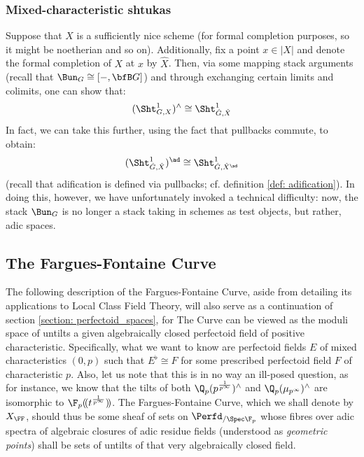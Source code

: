             \subsubsection{Mixed-characteristic shtukas}
                Suppose that $X$ is a sufficiently nice scheme (for formal completion purposes, so it might be noetherian and so on). Additionally, fix a point $x \in |X|$ and denote the formal completion of $X$ at $x$ by $\hat{X}$. Then, via some mapping stack arguments (recall that $\Bun_G \cong [-, \bfB G]$) and through exchanging certain limits and colimits, one can show that:
                    $$(\Sht^1_{G, X})^{\wedge} \cong \Sht^1_{\hat{G}, \hat{X}}$$
                In fact, we can take this further, using the fact that pullbacks commute, to obtain:
                    $$(\Sht^1_{\hat{G}, \hat{X}})^{\ad} \cong \Sht^1_{\hat{G}, \hat{X}^{\ad}}$$
                (recall that adification is defined via pullbacks; cf. definition \ref{def: adification}). In doing this, however, we have unfortunately invoked a technical difficulty: now, the stack $\Bun_G$ is no longer a stack taking in schemes as test objects, but rather, adic spaces. 
        
        \subsection{The Fargues-Fontaine Curve}
            The following description of the Fargues-Fontaine Curve, aside from detailing its applications to Local Class Field Theory, will also serve as a continuation of section \ref{section: perfectoid_spaces}, for The Curve can be viewed as the moduli space of untilts a given algebraically closed perfectoid field of positive characteristic. Specifically, what we want to know are perfectoid fields $E$ of mixed characteristics $(0, p)$ such that $E^{\flat} \cong F$ for some prescribed perfectoid field $F$ of characteristic $p$. Also, let us note that this is in no way an ill-posed question, as for instance, we know that the tilts of both $\Q_p(p^{\frac{1}{p^{\infty}}})^{\wedge}$ and $\Q_p(\mu_{p^{\infty}})^{\wedge}$ are isomorphic to $\F_p(\!(t^{\frac{1}{p^{\infty}}})\!)$. The Fargues-Fontaine Curve, which we shall denote by $X_{\FF}$, should thus be some sheaf of sets on $\Perfd_{/\Spec \F_p}$ whose fibres over adic spectra of algebraic closures of adic residue fields (understood as \textit{geometric points}) shall be sets of untilts of that very algebraically closed field.
            
